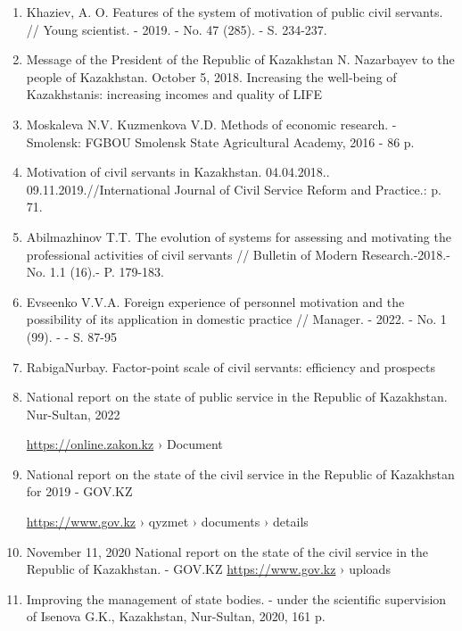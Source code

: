 \begin{enumerate}
\item
Khaziev, A. O. Features of the system of motivation of public civil
servants. // Young scientist. - 2019. - No. 47 (285). - S. 234-237.

\item
Message of the President of the Republic of Kazakhstan N. Nazarbayev
to the people of Kazakhstan. October 5, 2018. Increasing the well-being
of Kazakhstanis: increasing incomes and quality of LIFE

\item
Moskaleva N.V. Kuzmenkova V.D. Methods of economic research. -
Smolensk: FGBOU Smolensk State Agricultural Academy, 2016 - 86 p.

\item
Motivation of civil servants in Kazakhstan. 04.04.2018..
09.11.2019.//International Journal of Civil Service Reform and
Practice.: p. 71.

\item
Abilmazhinov T.T. The evolution of systems for assessing and
motivating the professional activities of civil servants // Bulletin of
Modern Research.-2018.- No. 1.1 (16).- P. 179-183.

\item
Evseenko V.V.A. Foreign experience of personnel motivation and the
possibility of its application in domestic practice // Manager. - 2022.
- No. 1 (99). - - S. 87-95

\item
RabigaNurbay. Factor-point scale of civil servants: efficiency and
prospects

\item
National report on the state of public service in the Republic of
Kazakhstan. Nur-Sultan, 2022

\href{https://online.zakon.kz}{https://online.zakon.kz} › Document

\item
National report on the state of the civil service in the Republic of
Kazakhstan for 2019 - GOV.KZ

\href{https://www.gov.kz}{https://www.gov.kz} › qyzmet › documents ›
details

\item
November 11, 2020 National report on the state of the civil service
in the Republic of Kazakhstan. - GOV.KZ \href{https://www.gov.kz}{https://www.gov.kz} › uploads

\item
Improving the management of state bodies. - under the scientific
supervision of Isenova G.K., Kazakhstan, Nur-Sultan, 2020, 161 p.


\end{enumerate}
